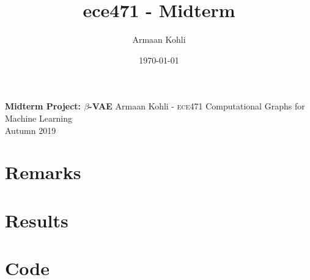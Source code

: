 \documentclass[justified,nobib]{tufte-handout}
\title{ece471 - Midterm}
\author{Armaan Kohli}
\date{\today}
\begin{document}
\begin{fullwidth}
{
  \noindent\fontsize{12pt}{20pt}\selectfont\textbf{Midterm Project: $\beta$-VAE}
  \newline
  \fontsize{12pt}{18pt}\selectfont
  {Armaan Kohli - \scshape ece}471 Computational Graphs for Machine Learning \\Autumn 2019\\
}
\raggedright
\raggedbottom
\section{Remarks}
\paragraph{} \cite{gpip}

\section{Results}


\clearpage
\section{Code}
\begin{lstlisting}[language=Python]


\end{lstlisting}

{}

\clearpage

\end{fullwidth}
\end{document}
